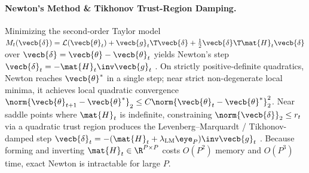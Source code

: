 \documentclass[../../../../master.tex]{subfiles}
\begin{document}
\paragraph{Newton's Method \& Tikhonov Trust-Region Damping.}
Minimizing the second-order Taylor model $M_t(\vecb{\delta}) = \mathcal{L}(\vecb{\theta}_t) + \vecb{g}_t\T\vecb{\delta} + \frac{1}{2}\vecb{\delta}\T \mat{H}_t\vecb{\delta}$ over $\vecb{\delta} = \vecb{\theta} - \vecb{\theta}_t$ yields Newton's step $\vecb{\delta}_t = -\mat{H}_t\inv\vecb{g}_t$  . On strictly positive-definite quadratics, Newton reaches $\vecb{\theta}^*$ in a single step; near strict non-degenerate local minima, it achieves local quadratic convergence $\norm{\vecb{\theta}_{t+1}-\vecb{\theta}^*}_2 \le C\norm{\vecb{\theta}_t-\vecb{\theta}^*}_2^2$. Near saddle points where $\mat{H}_t$ is indefinite, constraining $\norm{\vecb{\delta}}_2 \le r_t$ via a quadratic trust region produces the Levenberg--Marquardt / Tikhonov-damped step $\vecb{\delta}_t = -(\mat{H}_t + \lambda_{\mathrm{LM}}\eye_P)\inv \vecb{g}_t$  . Because forming and inverting $\mat{H}_t \in \R^{P \times P}$ costs $O(P^2)$ memory and $O(P^3)$ time, exact Newton is intractable for large $P$.
\end{document}
